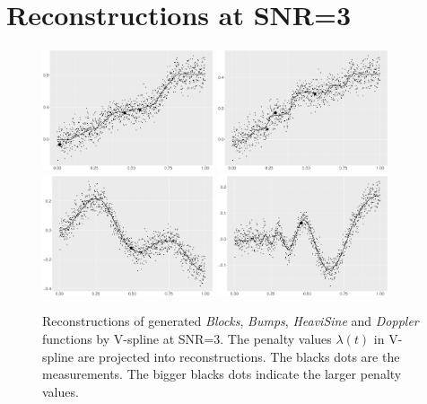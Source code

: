 

\section{Reconstructions at SNR=3}
\begin{figure}[!ht]
    \centering
    \includegraphics[width=0.45\textwidth]{Appendices/ggplot/ggBlocksPenaltyLineSNR3.pdf}
    \includegraphics[width=0.45\textwidth]{Appendices/ggplot/ggBumpsPenaltyLineSNR3.pdf}
    \includegraphics[width=0.45\textwidth]{Appendices/ggplot/ggHeaviPenaltyLineSNR3.pdf}
    \includegraphics[width=0.45\textwidth]{Appendices/ggplot/ggDopplerPenaltyLineSNR3.pdf}
\caption{Reconstructions of generated \textit{Blocks}, \textit{Bumps}, \textit{HeaviSine} and \textit{Doppler} functions by V-spline at SNR=3. The penalty values $\lambda(t)$ in V-spline are projected into reconstructions. The blacks dots are the measurements. The bigger blacks dots indicate the larger penalty values.}\label{TractorsplineSNR3}
\end{figure}


